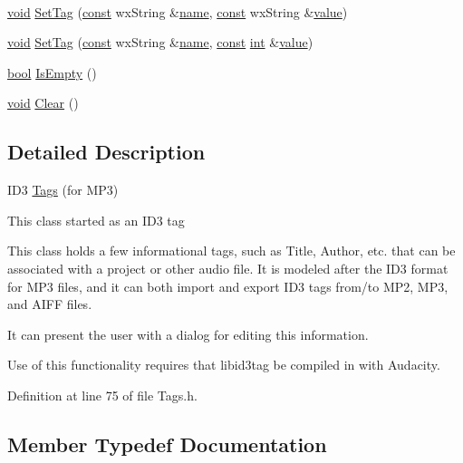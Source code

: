 \begin{DoxyCompactItemize}
$$\item 
\hyperlink{sound_8c_ae35f5844602719cf66324f4de2a658b3}{void} \hyperlink{class_tags_a6c337e78231cc8f2b18f263f4d81470b}{Set\+Tag} (\hyperlink{getopt1_8c_a2c212835823e3c54a8ab6d95c652660e}{const} wx\+String \&\hyperlink{lib_2expat_8h_a1b49b495b59f9e73205b69ad1a2965b0}{name}, \hyperlink{getopt1_8c_a2c212835823e3c54a8ab6d95c652660e}{const} wx\+String \&\hyperlink{lib_2expat_8h_a4a30a13b813682e68c5b689b45c65971}{value})
\item 
\hyperlink{sound_8c_ae35f5844602719cf66324f4de2a658b3}{void} \hyperlink{class_tags_a3eaef7eb3516288a0e6cf6917aefad9b}{Set\+Tag} (\hyperlink{getopt1_8c_a2c212835823e3c54a8ab6d95c652660e}{const} wx\+String \&\hyperlink{lib_2expat_8h_a1b49b495b59f9e73205b69ad1a2965b0}{name}, \hyperlink{getopt1_8c_a2c212835823e3c54a8ab6d95c652660e}{const} \hyperlink{xmltok_8h_a5a0d4a5641ce434f1d23533f2b2e6653}{int} \&\hyperlink{lib_2expat_8h_a4a30a13b813682e68c5b689b45c65971}{value})
\item 
\hyperlink{mac_2config_2i386_2lib-src_2libsoxr_2soxr-config_8h_abb452686968e48b67397da5f97445f5b}{bool} \hyperlink{class_tags_ad86e0d13dbb86449e3131dee7de59825}{Is\+Empty} ()
\item 
\hyperlink{sound_8c_ae35f5844602719cf66324f4de2a658b3}{void} \hyperlink{class_tags_a13643cc5e5f9b2f81302510d5a69c266}{Clear} ()
\end{DoxyCompactItemize}


\subsection{Detailed Description}
I\+D3 \hyperlink{class_tags}{Tags} (for M\+P3) 

This class started as an I\+D3 tag

This class holds a few informational tags, such as Title, Author, etc. that can be associated with a project or other audio file. It is modeled after the I\+D3 format for M\+P3 files, and it can both import and export I\+D3 tags from/to M\+P2, M\+P3, and A\+I\+FF files.

It can present the user with a dialog for editing this information.

Use of this functionality requires that libid3tag be compiled in with Audacity. 

Definition at line 75 of file Tags.\+h.



\subsection{Member Typedef Documentation}
